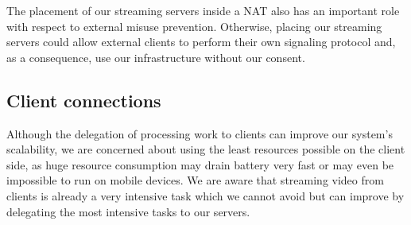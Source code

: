 
The placement of our streaming servers inside a \ac{NAT} also has an important role with respect to external misuse prevention. Otherwise, placing our streaming servers could allow external clients to perform their own signaling protocol and, as a consequence, use our infrastructure without our consent.

\subsection{Client connections}
	Although the delegation of processing work to clients can improve our system's scalability, we are concerned about using the least resources possible on the client side, as huge resource consumption may drain battery very fast or may even be impossible to run on mobile devices. We are aware that streaming video from clients is already a very intensive task which we cannot avoid but can improve by delegating the most intensive tasks to our servers. 

